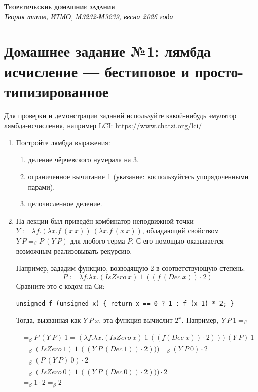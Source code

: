 \documentclass[10pt,a4paper,oneside]{article}
\begin{document}
\begin{center}{\Large\textsc{\textbf{Теоретические домашние задания}}}\\
             \it Теория типов, ИТМО, М3232-М3239, весна 2026 года\end{center}

\section*{Домашнее задание №1: лямбда исчисление --- бестиповое и просто-типизированное}


Для проверки и демонстрации заданий используйте какой-нибудь эмулятор лямбда-исчисления,
например LCI: \url{https://www.chatzi.org/lci/}

\begin{enumerate}

\item Постройте лямбда выражения:
\begin{enumerate}
\item деление чёрчевского нумерала на 3.
\item ограниченное вычитание 1 (указание: воспользуйтесь упорядоченными парами).
\item целочисленное деление.
\end{enumerate}

\item На лекции был приведён комбинатор неподвижной точки $Y := \lambda f.(\lambda x.f\ (x\ x))\ (\lambda x.f\ (x\ x))$, обладающий свойством
$Y\ P =_\beta P\ (Y\ P)$ для любого терма $P$. С его помощью оказывается возможным реализовывать рекурсию.

Например, зададим функцию, возводящую 2 в соответствующую степень: $$P := \lambda f.\lambda x.(IsZero\ x)\ 1\ ((f\ (Dec\ x)) \cdot 2)$$
Сравните это с кодом на Си: 
\begin{center}\verb!unsigned f (unsigned x) { return x == 0 ? 1 : f (x-1) * 2; }!\end{center}
Тогда, вызванная как $Y\ P\ x$, эта функция вычислит $2^x$. Например, $Y\ P\ 1 =_\beta$

\vspace{-0.3cm}
$$\begin{array}{l}=_\beta P\ (Y\ P)\ 1 = (\lambda f.\lambda x.(IsZero\ x)\ 1\ ((f (Dec\ x))\cdot 2)))\ (Y\ P)\ 1 \\
  =_\beta (IsZero\ 1)\ 1\ ((Y\ P\ (Dec\ 1)) \cdot 2))) =_\beta (Y\ P\ 0) \cdot 2 \\
  =_\beta (P\ (Y\ P)\ 0) \cdot 2 \\
  =_\beta (IsZero\ 0)\ 1\ ((Y\ P\ (Dec\ 0)) \cdot 2))) \cdot 2\\
  =_\beta 1 \cdot 2 =_\beta 2\end{array}$$


\end{enumerate}
\end{document}
